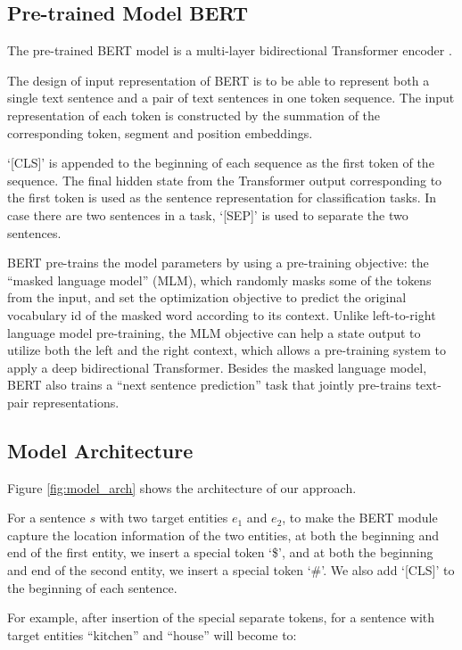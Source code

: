 \documentclass[11pt]{article}
\providecommand{\cite}[1]{\citeauthoryear{#1}}
\renewcommand{\cite}{\citep}
\begin{document}
\subsection{Pre-trained Model BERT}
The pre-trained BERT model \cite{bert_Jacobv_corr_bert_2018} is a multi-layer bidirectional
Transformer encoder
\cite{Vaswani_NIPS_2017}.

The design of input representation of BERT is to be able to
represent both a single text sentence and a pair of
text sentences in one
token sequence.  The input representation of each token
is constructed by the summation of the corresponding
token, segment and position embeddings.


`[CLS]' is appended to the beginning of each sequence
as the first token of the sequence. The final hidden
state from the Transformer output corresponding to the first token is used as the sentence representation
for classification tasks. In case there are two sentences
in a task, `[SEP]' is used to separate the two sentences. 

BERT pre-trains the model parameters by using a
pre-training objective: the “masked language model” (MLM), which randomly
masks some of the tokens from the input, and set the optimization objective to predict the original vocabulary id of the masked word according to its context. 
Unlike
left-to-right language model pre-training, the
MLM objective can help a state output to utilize both
the left and the right context, which allows a pre-training
system to apply a deep bidirectional Transformer. Besides the masked language model, BERT also
trains a ``next sentence prediction'' task that
jointly pre-trains text-pair representations.





\subsection{Model Architecture}

Figure \ref{fig:model_arch} shows the architecture of our approach.

For a sentence $s$ with two target entities $e_1$ and $e_2$,
to make the BERT module capture the location information of the two entities,
at both the beginning and end of the first entity, we insert
a special token `\$', and at both the beginning and end of the second entity, we insert a special token `\#'. 
We also add `[CLS]' to the beginning of each sentence. 

For example, after insertion of the special separate tokens, for a sentence with target entities ``kitchen'' and ``house'' will become to:
\end{document}
